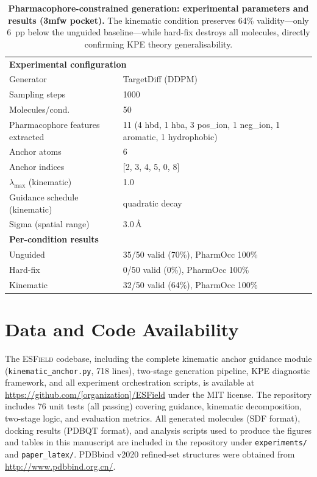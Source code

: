 \documentclass{article}
\newcommand{\ESField}{\textsc{ESField}}
\begin{document}
\begin{table}[H]
  \centering
  \caption{\textbf{Pharmacophore-constrained generation: experimental
    parameters and results (3mfw pocket).}
    The kinematic condition preserves 64\% validity---only 6~pp below the
    unguided baseline---while hard-fix destroys all molecules, directly
    confirming KPE theory generalisability.}
  \label{tab:pharm_poc}
  \small
  \begin{tabular}{l l}
    \toprule
    \multicolumn{2}{l}{\textbf{Experimental configuration}} \\
    Generator        & TargetDiff (DDPM) \\
    Sampling steps   & 1000 \\
    Molecules/cond.  & 50 \\
    Pharmacophore features extracted & 11 (4 hbd, 1 hba, 3 pos\_ion, 1 neg\_ion, 1 aromatic, 1 hydrophobic) \\
    Anchor atoms     & 6 \\
    Anchor indices   & [2, 3, 4, 5, 0, 8] \\
    $\lambda_{\max}$ (kinematic) & 1.0 \\
    Guidance schedule (kinematic) & quadratic decay \\
    Sigma (spatial range) & 3.0\,\AA \\
    \midrule
    \multicolumn{2}{l}{\textbf{Per-condition results}} \\
    \midrule
    Unguided  & 35/50 valid (70\%), PharmOcc 100\% \\
    Hard-fix  & 0/50 valid (0\%), PharmOcc 100\% \\
    Kinematic & 32/50 valid (64\%), PharmOcc 100\% \\
    \bottomrule
  \end{tabular}
\end{table}


\section*{Data and Code Availability}

The \ESField{} codebase, including the complete kinematic anchor guidance
module (\texttt{kinematic\_anchor.py}, 718 lines), two-stage generation
pipeline, KPE diagnostic framework, and all experiment orchestration
scripts, is available at \url{https://github.com/[organization]/ESField}
under the MIT license.  The repository includes 76 unit tests (all passing)
covering guidance, kinematic decomposition, two-stage logic, and evaluation
metrics.  All generated molecules (SDF format), docking results (PDBQT
format), and analysis scripts used to produce the figures and tables in
this manuscript are included in the repository under \texttt{experiments/}
and \texttt{paper\_latex/}.  PDBbind v2020 refined-set structures were
obtained from \url{http://www.pdbbind.org.cn/}.
\end{document}
